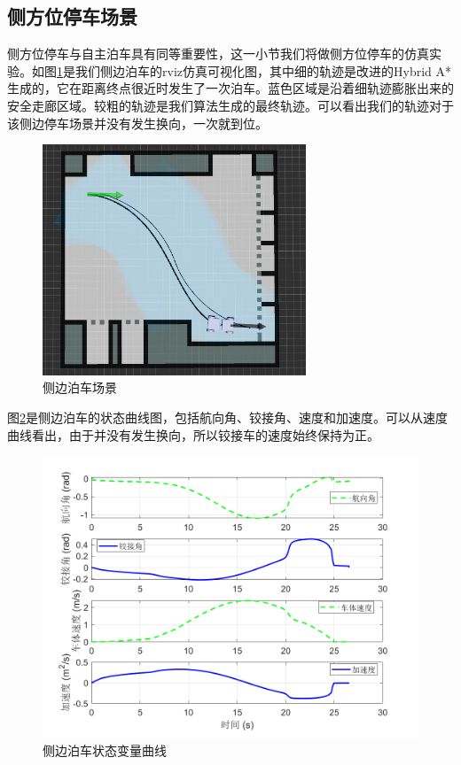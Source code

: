 \documentclass[master,academic]{ysuthesis} %
\begin{document}
		\subsection{侧方位停车场景}
		侧方位停车与自主泊车具有同等重要性，这一小节我们将做侧方位停车的仿真实验。如图\ref{fig:cebianboche}是我们侧边泊车的rviz仿真可视化图，其中细的轨迹是改进的Hybrid A*生成的，它在距离终点很近时发生了一次泊车。蓝色区域是沿着细轨迹膨胀出来的安全走廊区域。较粗的轨迹是我们算法生成的最终轨迹。可以看出我们的轨迹对于该侧边停车场景并没有发生换向，一次就到位。
		\begin{figure}[!ht]
			\centering
			\includegraphics[width=0.7\textwidth]{cebianboche.png}
			\caption{侧边泊车场景}
			\label{fig:cebianboche}
		\end{figure}

		图\ref{fig:datacebianstate}是侧边泊车的状态曲线图，包括航向角、铰接角、速度和加速度。可以从速度曲线看出，由于并没有发生换向，所以铰接车的速度始终保持为正。
		\begin{figure}[!ht]
			\centering
			\includegraphics[width=1\textwidth]{datacebianstate.png}
			\caption{侧边泊车状态变量曲线}
			\label{fig:datacebianstate}
		\end{figure}
\end{document}
